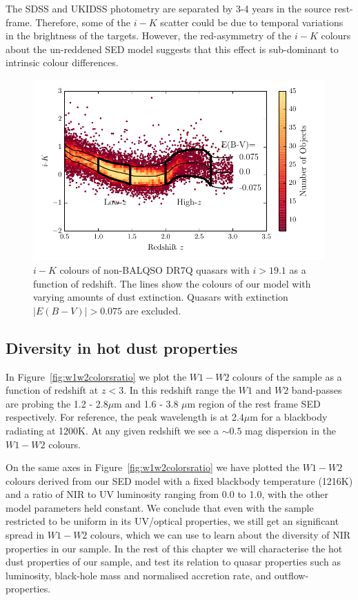 The SDSS and UKIDSS photometry are separated by 3-4 years in the source rest-frame. 
Therefore, some of the $i-K$ scatter could be due to temporal variations in the brightness of the targets. 
However, the red-asymmetry of the $i-K$ colours about the un-reddened \ac{SED} model suggests that this effect is sub-dominant to intrinsic colour differences. 

\begin{figure}
  \centering
  \includegraphics[width=\columnwidth]{figures/chapter05/ik_versus_z_low_ext.pdf}
  \caption{$i-K$ colours of non-BALQSO DR7Q quasars with $i>19.1$ as a function of redshift. The lines show the colours of our model with varying amounts of dust extinction. Quasars with extinction $|E(B-V)|>0.075$ are excluded.}
  \label{fig:ikzplot}
\end{figure}

\subsection{Diversity in hot dust properties}

In Figure~\ref{fig:w1w2colorsratio} we plot the $W1 - W2$ colours of the sample as a function of redshift at $z<3$. 
In this redshift range the $W1$ and $W2$ band-passes are probing the 1.2 - 2.8$\mu$m and 1.6 - 3.8 $\mu$m region of the rest frame \ac{SED} respectively. 
For reference, the peak wavelength is at 2.4$\mu$m for a blackbody radiating at 1200K. 
At any given redshift we see a $\sim 0.5$ mag dispersion in the $W1-W2$ colours. 

On the same axes in Figure~\ref{fig:w1w2colorsratio} we have plotted the $W1-W2$ colours derived from our \ac{SED} model with a fixed blackbody temperature (1216K) and a ratio of \ac{NIR} to UV luminosity ranging from 0.0 to 1.0, with the other model parameters held constant. 
We conclude that even with the sample restricted to be uniform in its UV/optical properties, we still get an significant spread in $W1-W2$ colours, which we can use to learn about the diversity of \ac{NIR} properties in our sample. 
In the rest of this chapter we will characterise the hot dust properties of our sample, and test its relation to quasar properties such as luminosity, black-hole mass and normalised accretion rate, and outflow-properties. 

